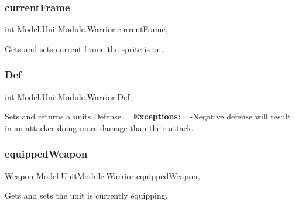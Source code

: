 \subsubsection{\texorpdfstring{current\+Frame}{currentFrame}}
{\footnotesize\ttfamily int Model.\+Unit\+Module.\+Warrior.\+current\+Frame\hspace{0.3cm}{\ttfamily [get]}, {\ttfamily [set]}}

Gets and sets current frame the sprite is on. \hypertarget{class_model_1_1_unit_module_1_1_warrior_a497f0b65d1e1159a57636f4ae279fa86}{}\label{class_model_1_1_unit_module_1_1_warrior_a497f0b65d1e1159a57636f4ae279fa86} 
\subsubsection{\texorpdfstring{Def}{Def}}
{\footnotesize\ttfamily int Model.\+Unit\+Module.\+Warrior.\+Def\hspace{0.3cm}{\ttfamily [get]}, {\ttfamily [set]}}

Sets and returns a unit\textquotesingle{}s Defense. ~\newline
 {\bfseries Exceptions\+:} ~\newline
 -\/\+Negative defense will result in an attacker doing more damage than their attack. \hypertarget{class_model_1_1_unit_module_1_1_warrior_aa99d785534eabc453977f56cd207aea6}{}\label{class_model_1_1_unit_module_1_1_warrior_aa99d785534eabc453977f56cd207aea6} 
\subsubsection{\texorpdfstring{equipped\+Weapon}{equippedWeapon}}
{\footnotesize\ttfamily \hyperlink{interface_model_1_1_weapon_module_1_1_weapon}{Weapon} Model.\+Unit\+Module.\+Warrior.\+equipped\+Weapon\hspace{0.3cm}{\ttfamily [get]}, {\ttfamily [set]}}

Gets and sets the unit is currently equipping. \hypertarget{class_model_1_1_unit_module_1_1_warrior_af8c7aa90b8bbd046bea9d400d9f479d2}{}\label{class_model_1_1_unit_module_1_1_warrior_af8c7aa90b8bbd046bea9d400d9f479d2} 
